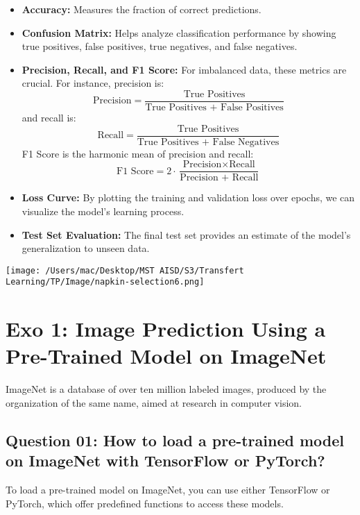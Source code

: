 \documentclass{article}
\begin{document}
\begin{itemize}
    \item \textbf{Accuracy:} Measures the fraction of correct predictions.
    \item \textbf{Confusion Matrix:} Helps analyze classification performance by showing true positives, false positives, true negatives, and false negatives.
    \item \textbf{Precision, Recall, and F1 Score:} For imbalanced data, these metrics are crucial. For instance, precision is:
    \[
    \text{Precision} = \frac{\text{True Positives}}{\text{True Positives + False Positives}}
    \]
    and recall is:
    \[
    \text{Recall} = \frac{\text{True Positives}}{\text{True Positives + False Negatives}}
    \]
    F1 Score is the harmonic mean of precision and recall:
    \[
    \text{F1 Score} = 2 \cdot \frac{\text{Precision} \times \text{Recall}}{\text{Precision + Recall}}
    \]
    \item \textbf{Loss Curve:} By plotting the training and validation loss over epochs, we can visualize the model's learning process.
    \item \textbf{Test Set Evaluation:} The final test set provides an estimate of the model’s generalization to unseen data.
\end{itemize}

\begin{center}
    \texttt{[image: /Users/mac/Desktop/MST AISD/S3/Transfert Learning/TP/Image/napkin-selection6.png]}
\end{center}
\newpage

\section{Exo 1: Image Prediction Using a Pre-Trained Model on ImageNet}

ImageNet is a database of over ten million labeled images, produced by the organization of the same name, aimed at research in computer vision.

\subsection{Question 01: How to load a pre-trained model on ImageNet with TensorFlow or PyTorch?}

\justify
To load a pre-trained model on ImageNet, you can use either TensorFlow or PyTorch, which offer predefined functions to access these models. 
\end{document}
